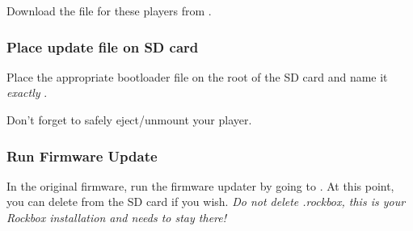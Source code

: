 Download the  file for these players from .


\subsubsection{Place update file on SD card}\label{ref:place_on_sd_card}
Place the appropriate bootloader file on the root of the SD card and name it
\emph{exactly} .


Don't forget to safely eject/unmount your player.

\subsubsection{Run Firmware Update}\label{ref:run_firmware_update}
In the original firmware, run the firmware updater by going to
. At this point, you can delete
 from the SD card if you wish. \emph{Do not delete .rockbox,
this is your Rockbox installation and needs to stay there!}
